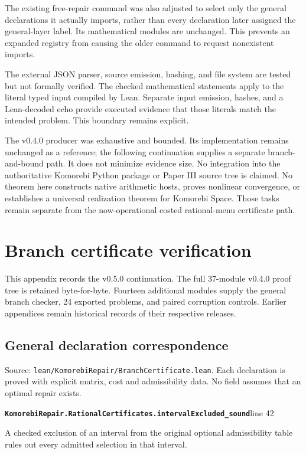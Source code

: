 \documentclass[11pt,letterpaper,oneside,openany]{book}
\theoremstyle{quiet}
\newcommand{\record}[3]{\noindent\begin{minipage}{\linewidth}\small\textbf{\nolinkurl{#1}}\hfill\textsf{line #2}\par\smallskip #3\end{minipage}\par\vspace{7pt}}
\begin{document}
The existing free-repair command was also adjusted to select only the general declarations it actually imports, rather than every declaration later assigned the general-layer label. Its mathematical modules are unchanged. This prevents an expanded registry from causing the older command to request nonexistent imports.

The external JSON parser, source emission, hashing, and file system are tested but not formally verified. The checked mathematical statements apply to the literal typed input compiled by Lean. Separate input emission, hashes, and a Lean-decoded echo provide executed evidence that those literals match the intended problem. This boundary remains explicit.

The v0.4.0 producer was exhaustive and bounded. Its implementation remains unchanged as a reference; the following continuation supplies a separate branch-and-bound path. It does not minimize evidence size. No integration into the authoritative Komorebi Python package or Paper III source tree is claimed. No theorem here constructs native arithmetic hosts, proves nonlinear convergence, or establishes a universal realization theorem for Komorebi Space. Those tasks remain separate from the now-operational costed rational-menu certificate path.


\chapter{Branch certificate verification}

\label{app:branch}

This appendix records the v0.5.0 continuation. The full 37-module v0.4.0 proof tree is retained byte-for-byte. Fourteen additional modules supply the general branch checker, 24 exported problems, and paired corruption controls. Earlier appendices remain historical records of their respective releases.

\section{General declaration correspondence}

Source: \nolinkurl{lean/KomorebiRepair/BranchCertificate.lean}. Each declaration is proved with explicit matrix, cost and admissibility data. No field assumes that an optimal repair exists.

\record{KomorebiRepair.RationalCertificates.intervalExcluded_sound}{42}{A checked exclusion of an interval from the original optional admissibility table rules out every admitted selection in that interval.}
\end{document}
